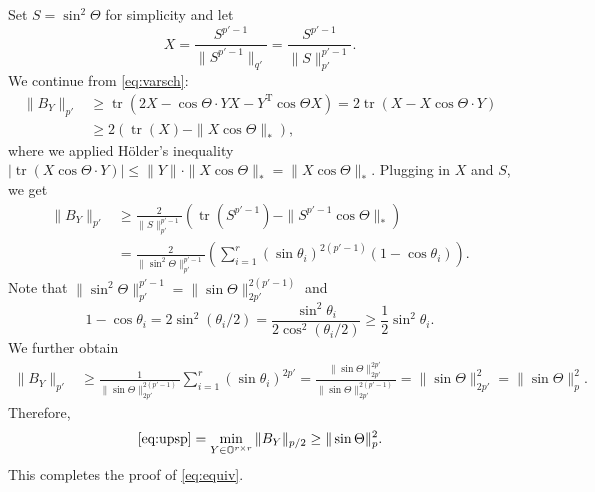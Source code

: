 \documentclass[reqno]{amsart}
\DeclareMathOperator{\tr}{tr}
\newcommand{\T}{\mathrm{T}}
\theoremstyle{plain}
\theoremstyle{definition}
\begin{document}
Set $S=\sin^2\Theta$ for simplicity and let $$X=\frac{S^{p'-1}}{\|S^{p'-1}\|_{q'} }=\frac{S^{p'-1}}{\|S\|_{p'}^{p'-1}}.$$ We continue from \eqref{eq:varsch}:
\begin{align*}
\|B_Y\|_{p'} &\ge \tr\left(2 X - \cos\Theta \cdot Y X - Y^\T \cos\Theta X  \right)=2\tr(X-X\cos\Theta \cdot Y)\\
&\ge 2\left( \tr(X) - \|X\cos\Theta\|_{*}\right),
\end{align*}
where we applied H\"older's inequality $\left|\tr(X\cos\Theta \cdot Y ) \right| \le \|Y\| \cdot \|X\cos\Theta \|_{*}=\|X\cos\Theta \|_{*}.$ Plugging in $X$ and $S$, we get
\begin{align*}
\|B_Y\|_{p'} &\ge \frac{2}{\|S\|_{p'}^{p'-1}}\left( \tr(S^{p'-1}) - \|S^{p'-1} \cos\Theta\|_* \right)\\
&= \frac{2}{\|\sin^2\Theta\|_{p'}^{p'-1}}\left( \sum_{i=1}^r (\sin\theta_i)^{2(p'-1)} (1-\cos\theta_i) \right).
\end{align*}
Note that $\|\sin^2\Theta\|_{p'}^{p'-1} = \|\sin\Theta\|_{2p'}^{2(p'-1)}$ and $$1-\cos\theta_i = 2\sin^2(\theta_i/2) = \frac{\sin^2\theta_i}{2\cos^2(\theta_i/2)}\ge \frac{1}{2}\sin^2\theta_i.$$We further obtain
\begin{align*}
\|B_Y\|_{p'} &\ge \frac{1}{\|\sin\Theta\|_{2p'}^{2(p'-1)}}  \sum_{i=1}^r (\sin\theta_i)^{2 p'} = \frac{\|\sin\Theta\|_{2p'}^{2p'}}{\|\sin\Theta\|_{2p'}^{2(p'-1)}} = \|\sin\Theta\|_{2p'}^{2}=\|\sin\Theta\|_{p}^{2}.
\end{align*}
Therefore,
\begin{align*}
\eqref{eq:upsp}=\min_{Y\in \mathbb{O}^{r\times r}} \| B_Y \|_{p/2}\ge \|\sin\Theta\|_{p}^{2}.
\end{align*}
This completes the proof of \eqref{eq:equiv}.
\end{document}
